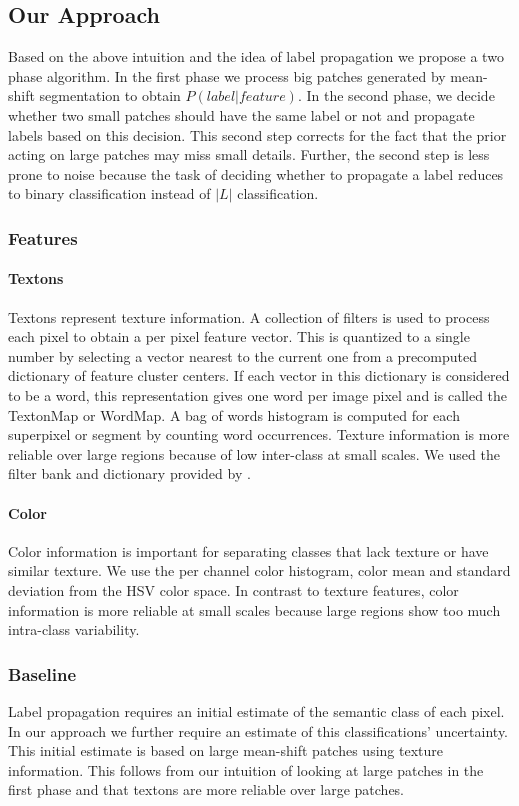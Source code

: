 \documentclass{article} %
\begin{document}
\subsection{Our Approach}
Based on the above intuition and the idea of label propagation we propose a two phase algorithm. In the first phase we process big patches generated by mean-shift segmentation to obtain $P(label | feature)$. In the second phase, we decide whether two small patches should have the same label or not and propagate labels based on this decision. This second step corrects for the fact that the prior acting on large patches may miss small details. Further, the second step is less prone to noise because the task of deciding whether to propagate a label reduces to binary classification instead of $|L|$ classification.

\subsubsection{Features}
\paragraph{Textons}
Textons represent texture information.
A collection of filters is used to process each pixel to obtain a per
pixel feature vector.
This is quantized to a single number by selecting a vector nearest to the
current one from a precomputed dictionary of feature cluster centers.
If each vector in this dictionary is considered to be a word, this
representation gives one word per image pixel and is called the TextonMap
or WordMap. %
A bag of words histogram is computed for each superpixel or segment by
counting word occurrences.
Texture information is more reliable over large regions because of low inter-class at small scales.
We used the filter bank and dictionary provided by \cite{malisiewicz-cvpr08}.

\paragraph{Color}
Color information is important for separating classes that lack texture or
have similar texture.
We use the per channel color histogram, color mean and standard deviation
from the HSV color space.
In contrast to texture features, color information is more reliable at small scales because large regions show too much intra-class variability.

\subsubsection{Baseline}
\label{baseline}
Label propagation requires an initial estimate of the semantic class of each pixel. In our approach we further require an estimate of this classifications' uncertainty. This initial estimate is based on large mean-shift patches using texture information. This follows from our intuition of looking at large patches in the first phase and that textons are more reliable over large patches.
\end{document}
